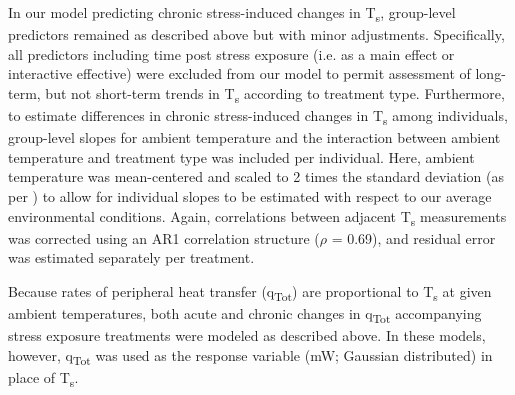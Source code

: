 \documentclass[12pt]{article}
\begin{document}
\noindent In our model predicting chronic stress-induced changes in T\textsubscript{s}, group-level predictors remained as described above but with minor adjustments. Specifically, all predictors including time post stress exposure (i.e. as a main effect or interactive effective) were excluded from our model to permit assessment of long-term, but not short-term trends in T\textsubscript{s} according to treatment type. Furthermore, to estimate differences in chronic stress-induced changes in T\textsubscript{s} among individuals, group-level slopes for ambient temperature and the interaction between ambient temperature and treatment type was included per individual. Here, ambient temperature was mean-centered and scaled to 2 times the standard deviation (as per \citealt{araya_2015}) to allow for individual slopes to be estimated with respect to our average environmental conditions. Again, correlations between adjacent T\textsubscript{s} measurements was corrected using an AR1 correlation structure ($\rho$ = 0.69), and residual error was estimated separately per treatment. \vspace{1cm}

\noindent Because rates of peripheral heat transfer (q\textsubscript{Tot}) are proportional to T\textsubscript{s} at given ambient temperatures, both acute and chronic changes in q\textsubscript{Tot} accompanying stress exposure treatments were modeled as described above. In these models, however, q\textsubscript{Tot} was used as the response variable (mW; Gaussian distributed) in place of T\textsubscript{s}. \vspace{1cm} 
\end{document}
